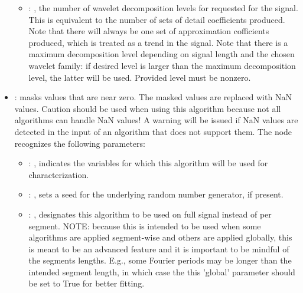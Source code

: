 \begin{itemize}
\begin{itemize}
        \item {}: , 
          the number of wavelet decomposition levels for requested for the signal. This is
          equivalent to                     the number of sets of detail coefficients produced. Note
          that there will always be one set of                     approximation cofficients
          produced, which is treated as a trend in the signal. Note that there is a
          maximum decomposition level depending on signal length and the chosen wavelet family: if
          desired                     level is larger than the maximum decomposition level, the
          latter will be used. Provided level must                     be nonzero.
      \end{itemize}

    \item {}:
      masks values that are near zero. The masked values are replaced with NaN     values. Caution
      should be used when using this algorithm because not all algorithms can handle     NaN values!
      A warning will be issued if NaN values are detected in the input of an algorithm that     does
      not support them.
      The  node recognizes the following parameters:
        \begin{itemize}
          \item {}: , 
            indicates the variables for which this algorithm will be used for characterization.
          \item {}: , 
            sets a seed for the underlying random number generator, if present.
          \item {}: , 
            designates this algorithm to be used on full signal instead of per
            segment. NOTE: because this is intended to be used when some algorithms are
            applied segment-wise and others are applied globally, this is meant to be an
            advanced feature and it is important to be mindful of the segments lengths.
            E.g., some Fourier periods may be longer than the intended segment length, in
            which case the this 'global' parameter should be set to True for better
            fitting. 
      \end{itemize}


\end{itemize}
